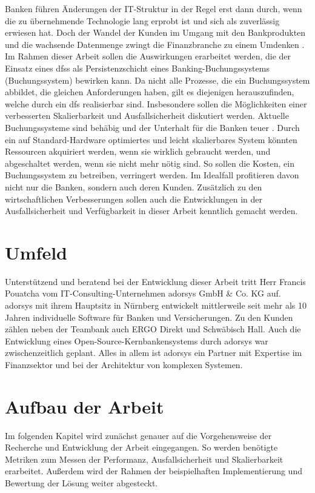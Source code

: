 \documentclass[12pt,oneside,a4paper,parskip]{scrbook}
\begin{document}
Banken führen Änderungen der IT-Struktur in der Regel erst dann durch, wenn die zu übernehmende Technologie lang erprobt ist und sich als zuverlässig erwiesen hat. Doch der Wandel der Kunden im Umgang mit den Bankprodukten und die wachsende Datenmenge zwingt die Finanzbranche zu einem Umdenken \cite{bigdataBigStorage}. Im Rahmen dieser Arbeit sollen die Auswirkungen erarbeitet werden, die der Einsatz eines \acp{dfs} als Persistenzschicht eines Banking-Buchungssystems (Buchungssystem) bewirken kann. Da nicht alle Prozesse, die ein Buchungssystem abbildet, die gleichen Anforderungen haben, gilt es diejenigen herauszufinden, welche durch ein \ac{dfs} realisierbar sind. Insbesondere sollen die Möglichkeiten einer verbesserten Skalierbarkeit und Ausfallsicherheit diskutiert werden. Aktuelle Buchungssysteme sind behäbig und der Unterhalt für die Banken teuer \cite{bankingsCosts}. Durch ein auf Standard-Hardware optimiertes und leicht skalierbares System könnten Ressourcen akquiriert werden, wenn sie wirklich gebraucht werden, und abgeschaltet werden, wenn sie nicht mehr nötig sind. So sollen die Kosten, ein Buchungssystem zu betreiben, verringert werden. Im Idealfall profitieren davon nicht nur die Banken, sondern auch deren Kunden. Zusätzlich zu den wirtschaftlichen Verbesserungen sollen auch die Entwicklungen in der Ausfallsicherheit und Verfügbarkeit in dieser Arbeit kenntlich gemacht werden.

\section{Umfeld}
Unterstützend und beratend bei der Entwicklung dieser Arbeit tritt Herr Francis Pouatcha vom IT-Consulting-Unternehmen adorsys GmbH \& Co. KG auf. adorsys mit ihrem Hauptsitz in Nürnberg entwickelt mittlerweile seit mehr als 10 Jahren individuelle Software für Banken und Versicherungen. Zu den Kunden zählen neben der Teambank auch ERGO Direkt und Schwäbisch Hall. Auch die Entwicklung eines Open-Source-Kernbankensystems durch adorsys war zwischenzeitlich geplant. Alles in allem ist adorsys ein Partner mit Expertise im Finanzsektor und bei der Architektur von komplexen Systemen.

\section{Aufbau der Arbeit}
Im folgenden Kapitel wird zunächst genauer auf die Vorgehensweise der Recherche und Entwicklung der Arbeit eingegangen. So werden benötigte Metriken zum Messen der Performanz, Ausfallsicherheit und Skalierbarkeit erarbeitet. Außerdem wird der Rahmen der beispielhaften Implementierung und Bewertung der Lösung weiter abgesteckt.
\end{document}
